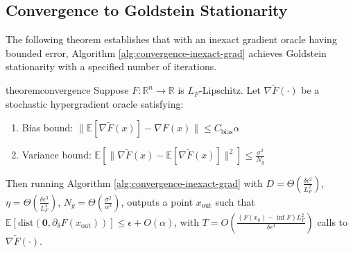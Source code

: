 \documentclass[letterpaper]{article} %
\newcommand{\1}{\mathbf{1}}
\begin{document}
\subsection{Convergence to Goldstein Stationarity}


The following theorem establishes that with an inexact gradient oracle having bounded error, Algorithm \ref{alg:convergence-inexact-grad} achieves Goldstein stationarity with a specified number of iterations.

\begin{restatable}{theorem}{convergence}\label{thm:convergence-stochastic-grad}
Suppose $F: \mathbb{R}^n \to \mathbb{R}$ is $L_F$-Lipschitz. Let $\nabla\tilde{F}(\cdot)$ be a stochastic hypergradient oracle satisfying:
\begin{enumerate}
    \item Bias bound: $\|\mathbb{E}[\nabla\tilde{F}(x)] - \nabla F(x)\| \leq C_{\text{bias}}\alpha$
    \item Variance bound: $\mathbb{E}[\|\nabla\tilde{F}(x) - \mathbb{E}[\nabla\tilde{F}(x)]\|^2] \leq \frac{\sigma^2}{N_g}$
\end{enumerate}
Then running Algorithm \ref{alg:convergence-inexact-grad} with $D = \Theta(\frac{\delta\epsilon^2}{L_F^2})$, $\eta = \Theta(\frac{\delta\epsilon^3}{L_F^4})$, $N_g = \Theta(\frac{\sigma^2}{\alpha^2})$, outputs a point $x_{\text{out}}$ such that $\mathbb{E}[\text{dist}(\mathbf{0}, \partial_\delta F(x_{\text{out}}))] \leq \epsilon + O(\alpha)$, with $T = O(\frac{(F(x_0)-\inf F)L_F^2}{\delta\epsilon^3})$ calls to $\nabla\tilde{F}(\cdot)$.
\end{restatable}
\end{document}
